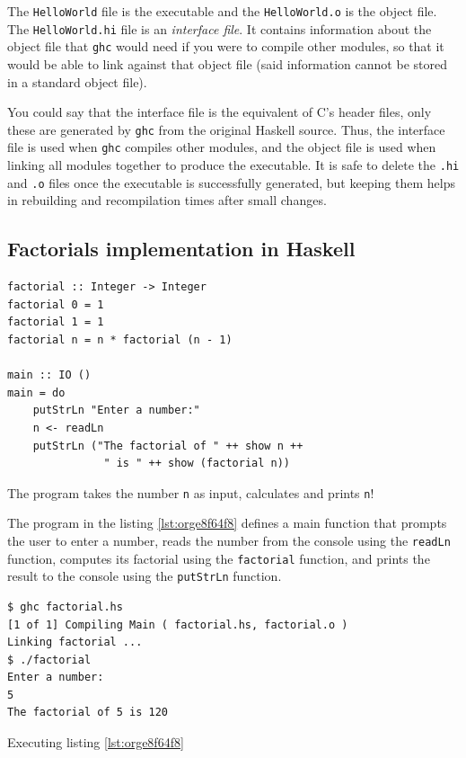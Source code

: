 \documentclass[a4paper, titlepage, twoside]{article}
\begin{document}
The \texttt{HelloWorld} file is the executable and the \texttt{HelloWorld.o} is the object file. The \texttt{HelloWorld.hi} file is an \emph{interface file}. It contains information about the object file that \texttt{ghc} would need if you were to compile other modules, so that it would be able to link against that object file (said information cannot be stored in a standard object file).

You could say that the interface file is the equivalent of C's header files, only these are generated by \texttt{ghc} from the original Haskell source. Thus, the interface file is used when \texttt{ghc} compiles other modules, and the object file is used when linking all modules together to produce the executable. It is safe to delete the \texttt{.hi} and \texttt{.o} files once the executable is successfully generated, but keeping them helps in rebuilding and recompilation times after small changes.

\subsection{Factorials implementation in Haskell}
\label{sec:org8d5da06}

\begin{listing}[htbp]
\begin{verbatim}
factorial :: Integer -> Integer
factorial 0 = 1
factorial 1 = 1
factorial n = n * factorial (n - 1)

main :: IO ()
main = do
    putStrLn "Enter a number:"
    n <- readLn
    putStrLn ("The factorial of " ++ show n ++
               " is " ++ show (factorial n))
\end{verbatim}
\caption{\label{lst:orge8f64f8}The program takes the number \texttt{n} as input, calculates and prints \texttt{n}!}
\end{listing}

The program in the listing \ref{lst:orge8f64f8} defines a main function that prompts the user to enter a number, reads the number from the console using the \texttt{readLn} function, computes its factorial using the \texttt{factorial} function, and prints the result to the console using the \texttt{putStrLn} function.

\begin{listing}[htbp]
\begin{verbatim}
$ ghc factorial.hs
[1 of 1] Compiling Main ( factorial.hs, factorial.o )
Linking factorial ...
$ ./factorial
Enter a number:
5
The factorial of 5 is 120
\end{verbatim}
\caption{Executing listing \ref{lst:orge8f64f8}}
\end{listing}
\end{document}
